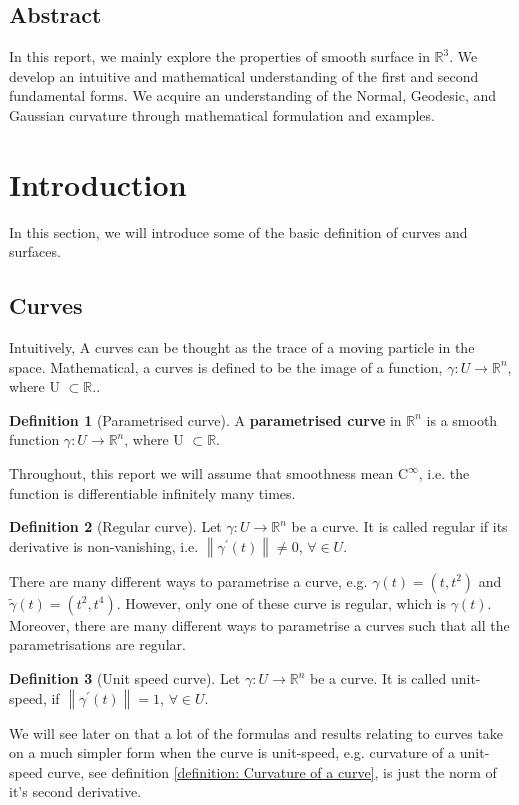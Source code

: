 \documentclass{article}
\theoremstyle{plain}
\theoremstyle{definition}
\newtheorem{definition}{Definition}
\theoremstyle{remark}
\newcommand{\R}{\mathbb{R}}
\begin{document}
\subsection*{Abstract}
In this report, we mainly explore the properties of smooth surface in \( \R^3 \). We develop an intuitive and mathematical understanding of the first and second fundamental forms. We acquire an understanding of the Normal, Geodesic, and Gaussian curvature through mathematical formulation and examples.

\newpage

\tableofcontents


\section{Introduction}
In this section, we will introduce some of the basic definition of curves and surfaces.
\subsection{Curves}
Intuitively, A curves can be thought as the trace of a moving particle in the space. Mathematical, a curves is defined to be the image of a function, \( \gamma: U \rightarrow \R^n \), where U \( \subset \R \)..

\begin{definition}[Parametrised curve]
    A \textbf{parametrised curve} in \( \R^n \) is a smooth function \( \gamma: U \rightarrow \R^n \), where U \( \subset \R \).
\end{definition}
Throughout, this report we will assume that smoothness mean \( \text{C}^\infty \), i.e. the function is differentiable infinitely many times.

\begin{definition}[Regular curve]
    Let \( \gamma: U \rightarrow \R^n \) be a curve. It is called regular if its derivative is non-vanishing, i.e. \( \left\lVert  \gamma^\prime(t) \right\rVert \neq 0 \), \( \forall \in U \).
\end{definition}

There are many different ways to parametrise a curve, e.g. \( \gamma(t) = (t, t^2)\) and \( \tilde{\gamma}(t) = (t^2, t^4)\). However, only one of these curve is regular, which is \( \gamma(t) \). Moreover, there are many different ways to parametrise a curves such that all the parametrisations are regular.

\begin{definition}[Unit speed curve]
    Let \( \gamma: U \rightarrow \R^n \) be a curve. It is called unit-speed, if \( \left\lVert  \gamma^\prime(t) \right\rVert = 1 \), \( \forall \in U \).
\end{definition}
We will see later on that a lot of the formulas and results relating to curves take on a much simpler form when the curve is unit-speed, e.g. curvature of a unit-speed curve, see definition \ref{definition: Curvature of a curve}, is just the norm of it's second derivative.
\end{document}
